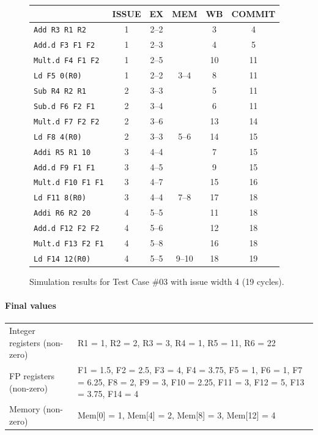 \documentclass[11pt]{article}
\renewcommand{\_}{\origunderscore\allowbreak}
\begin{document}
\begin{figure}[H]
\centering
\small
\begin{tabular}{lccccc}
\hline
 & ISSUE & EX & MEM & WB & COMMIT \\
\hline
\texttt{Add R3 R1 R2} & 1 & 2--2 &  & 3 & 4 \\
\texttt{Add.d F3 F1 F2} & 1 & 2--3 &  & 4 & 5 \\
\texttt{Mult.d F4 F1 F2} & 1 & 2--5 &  & 10 & 11 \\
\texttt{Ld F5 0(R0)} & 1 & 2--2 & 3--4 & 8 & 11 \\
\texttt{Sub R4 R2 R1} & 2 & 3--3 &  & 5 & 11 \\
\texttt{Sub.d F6 F2 F1} & 2 & 3--4 &  & 6 & 11 \\
\texttt{Mult.d F7 F2 F2} & 2 & 3--6 &  & 13 & 14 \\
\texttt{Ld F8 4(R0)} & 2 & 3--3 & 5--6 & 14 & 15 \\
\texttt{Addi R5 R1 10} & 3 & 4--4 &  & 7 & 15 \\
\texttt{Add.d F9 F1 F1} & 3 & 4--5 &  & 9 & 15 \\
\texttt{Mult.d F10 F1 F1} & 3 & 4--7 &  & 15 & 16 \\
\texttt{Ld F11 8(R0)} & 3 & 4--4 & 7--8 & 17 & 18 \\
\texttt{Addi R6 R2 20} & 4 & 5--5 &  & 11 & 18 \\
\texttt{Add.d F12 F2 F2} & 4 & 5--6 &  & 12 & 18 \\
\texttt{Mult.d F13 F2 F1} & 4 & 5--8 &  & 16 & 18 \\
\texttt{Ld F14 12(R0)} & 4 & 5--5 & 9--10 & 18 & 19 \\
\hline
\end{tabular}
\caption{Simulation results for Test Case \#03 with issue width 4 (19 cycles).}
\end{figure}

\paragraph{Final values}
\begin{tabularx}{\textwidth}{lX}
\hline
Integer registers (non-zero) & R1 = 1, R2 = 2, R3 = 3, R4 = 1, R5 = 11, R6 = 22 \\
FP registers (non-zero) & F1 = 1.5, F2 = 2.5, F3 = 4, F4 = 3.75, F5 = 1, F6 = 1, F7 = 6.25, F8 = 2, F9 = 3, F10 = 2.25, F11 = 3, F12 = 5, F13 = 3.75, F14 = 4 \\
Memory (non-zero) & Mem[0] = 1, Mem[4] = 2, Mem[8] = 3, Mem[12] = 4 \\
\hline
\end{tabularx}
\end{document}
